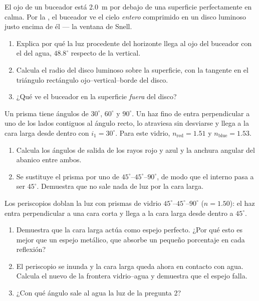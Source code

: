 \begin{exercise}[$\star\star\star$]\label{exo:g10:refraction:12}
El ojo de un buceador está \qty{2.0}{m} por debajo de una superficie
perfectamente en calma. Por la , el buceador ve el cielo
\emph{entero} comprimido en un disco luminoso justo encima de él --- la
ventana de Snell.
\begin{enumerate}
  \item Explica por qué la luz procedente del horizonte llega al ojo del
        buceador con el  del agua, $48.8^\circ$ respecto de
        la vertical.
  \item Calcula el radio del disco luminoso sobre la superficie, con la
        tangente en el triángulo rectángulo ojo--vertical--borde del
        disco.
  \item ¿Qué ve el buceador en la superficie \emph{fuera} del disco?
\end{enumerate}
\end{exercise}

\begin{exercise}[$\star\star\star$]\label{exo:g10:refraction:13}
Un prisma tiene ángulos de $30^\circ$, $60^\circ$ y $90^\circ$. Un haz
fino de  entra perpendicular a uno de los lados contiguos al
ángulo recto, lo atraviesa sin desviarse y llega a la cara larga desde
dentro con $i_1 = 30^\circ$. Para este vidrio, $n_{\text{red}} = 1.51$ y
$n_{\text{blue}} = 1.53$.
\begin{enumerate}
  \item Calcula los ángulos de salida de los rayos rojo y azul y la
        anchura angular del abanico entre ambos.
  \item Se sustituye el prisma por uno de
        $45^\circ$--$45^\circ$--$90^\circ$, de modo que el  interno pasa a ser $45^\circ$. Demuestra que no sale
        nada de luz por la cara larga.
\end{enumerate}
\end{exercise}

\begin{exercise}[$\star\star\star$]\label{exo:g10:refraction:14}
Los periscopios doblan la luz con prismas de vidrio
$45^\circ$--$45^\circ$--$90^\circ$ ($n = 1.50$): el haz entra
perpendicular a una cara corta y llega a la cara larga desde dentro a
$45^\circ$.
\begin{enumerate}
  \item Demuestra que la cara larga actúa como espejo perfecto. ¿Por qué
        esto es mejor que un espejo metálico, que absorbe un pequeño
        porcentaje en cada reflexión?
  \item El periscopio se inunda y la cara larga queda ahora en contacto
        con agua. Calcula el nuevo  de la frontera
        vidrio--agua y demuestra que el espejo falla.
  \item ¿Con qué ángulo sale al agua la luz de la pregunta 2?
\end{enumerate}
\end{exercise}


